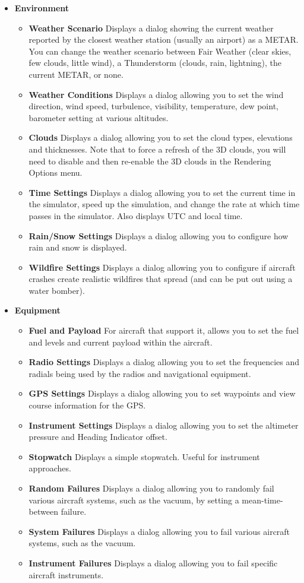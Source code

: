\begin{itemize}
\item \textbf{Environment}
 \begin{itemize}
  \item \textbf{Weather Scenario} Displays a dialog showing the current weather
reported by the closest
  weather station (usually an airport) as a METAR. You can change the weather
scenario between
  Fair Weather (clear skies, few clouds, little wind), a Thunderstorm (clouds,
rain, lightning), the current METAR, or none.
  \item \textbf{Weather Conditions}  Displays a dialog allowing you to set the
wind direction, wind speed,
  turbulence, visibility, temperature, dew point, barometer setting at various
altitudes.
  \item \textbf{Clouds}  Displays a dialog allowing you to set the cloud types,
elevations and thicknesses. Note that to force a refresh of the 3D clouds, you
will need to disable and then re-enable the 3D clouds in the Rendering Options menu.
  \item \textbf{Time Settings}  Displays a dialog allowing you to set the current
time in the simulator, speed up the simulation, and change the rate at which
time passes in the simulator. Also displays UTC and local time.
  \item \textbf{Rain/Snow Settings}  Displays a dialog allowing you to
configure how rain and snow is displayed.
  \item \textbf{Wildfire Settings}  Displays a dialog allowing you to
configure if aircraft crashes create realistic wildfires that spread (and can be put out
using a water bomber).
 \end{itemize}

\item \textbf{Equipment}
 \begin{itemize}
  \item \textbf{Fuel and Payload}  For aircraft that support it, allows you to
set the fuel and levels and current payload within the aircraft.
  \item \textbf{Radio Settings}  Displays a dialog allowing you to set the
frequencies and radials being used by the radios and navigational equipment.
  \item \textbf{GPS Settings}  Displays a dialog allowing you to set waypoints
and view course information for the GPS.
  \item \textbf{Instrument Settings}  Displays a dialog allowing you to set the
altimeter pressure and Heading Indicator offset.
  \item \textbf{Stopwatch}  Displays a simple stopwatch. Useful for instrument
approaches.
  \item \textbf{Random Failures} Displays a dialog allowing you to randomly fail various
aircraft systems, such as the vacuum, by setting a mean-time-between failure.
  \item \textbf{System Failures} Displays a dialog allowing you to fail various
aircraft systems, such as the vacuum.
  \item \textbf{Instrument Failures}  Displays a dialog allowing you to fail
specific aircraft instruments.
 \end{itemize}


\end{itemize}
